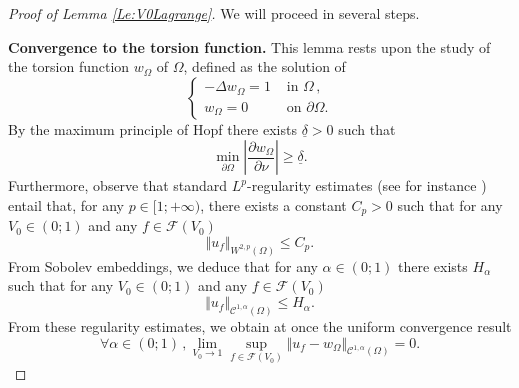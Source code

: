 \documentclass{article}
\newcommand{\N}{\textnormal{I\kern-0.21emN}}
\renewcommand{\geq}{\geqslant}
\renewcommand{\leq}{\leqslant}
\def\O{{\Omega}}
\numberwithin{equation}{section}
\begin{document}
\begin{proof}[Proof of Lemma \ref{Le:V0Lagrange}]
We will proceed in several steps.

\medskip

\noindent \textbf{Convergence to the torsion function.}
This lemma rests upon the study of the torsion function $w_\O$ of $\O$, defined as the solution of
\begin{equation}\label{Eq:Torsion}
\begin{cases}-\Delta w_\O=1&\text{ in }\O\,, 
\\ w_\O=0&\text{ on }\partial \O.\end{cases}\end{equation} By the maximum principle of Hopf there exists $\underline \delta>0$ such that 
\begin{equation}\label{Eq:EstTorsion} \min_{\partial \O}\left|\frac{\partial w_\O}{\partial \nu}\right|\geq \underline \delta.\end{equation}
Furthermore, observe that standard $L^p$-regularity estimates (see for instance \cite[Corollary 9.10]{GilbargTrudinger}) entail that, for any $p\in [1;+\infty)$, there exists a constant $C_p>0$ such that for any $V_0\in (0;1)$ and any $f\in \mathcal F(V_0)$ 
\[ \Vert u_f\Vert_{W^{2,p}(\O)}\leq C_p.\] From Sobolev embeddings, we deduce that for any $\alpha\in (0;1)$ there exists $H_\alpha$ such that for any $V_0\in (0;1)$ and any $f\in \mathcal F(V_0)$ 
\begin{equation}\label{Eq:TorsionHolder} \Vert u_f\Vert_{\mathscr C^{1,\alpha}( \O)}\leq H_\alpha.\end{equation} From these regularity estimates, we obtain at once the uniform convergence result
\begin{equation}\label{Eq:CvTorsion}
\forall \alpha \in (0;1)\,, \lim_{V_0\to 1}\sup_{f\in \mathcal F(V_0)}\Vert u_f-w_\O\Vert_{\mathscr C^{1,\alpha}(\O)}=0.
\end{equation}

\end{proof}
\end{document}
